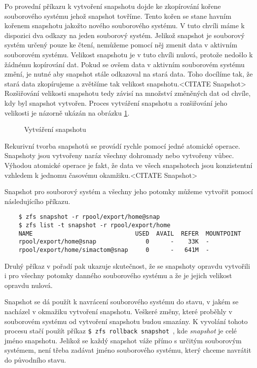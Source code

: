     Po provední příkazu k vytvoření snapshotu dojde ke zkopírování kořene souborového systému jehož snapshot tovříme. Tento kořen se stane havním kořenem snapshotu jakožto nového souborového systému. V tuto chvíli máme k dispozici dva odkazy na jeden souborový systém. Jelikož snapshot je souborový systém určený pouze ke čtení, nemůžeme pomocí něj zmenit data v aktivním souborovém systému. Velikost snapshotu je v tuto chvíli nulová, protože nedošlo k žádnému kopírování dat. Pokud se ovšem data v aktivním souborovém systému změní, je nutné aby snapshot stále odkazoval na stará data. Toho docílíme tak, že stará data zkopírujeme a zvětšíme tak velikost snapshotu.<CITATE Snapshot> Rozšiřování velikosti snapshotu tedy závisí na množství změněných dat od chvíle, kdy byl snapshot vytvořen. Proces vytváření snapshotu a rozšiřování jeho velikosti je názorně ukázán na obrázku \ref{snapshotproces}.
    \begin{figure}[h]
        \caption{Vytváření snapshotu}
        \label{snapshotproces}
    \end{figure}
    
    Rekurivní tvorba snapshotů se provádí rychle pomocí jedné atomické operace. Snapshoty jsou vytvořeny naráz všechny dohromady nebo vytvořeny vůbec. Výhodou atomické operace je fakt, že data ve všech snapshotech jsou konzistentní vzhledem k jednomu časovému okamžiku.<CITATE Snapshot>
    
    Snapshot pro souborový systém a všechny jeho potomky můžeme vytvořit pomocí následujícího příkazu.
    \begin{verbatim}
    $ zfs snapshot -r rpool/export/home@snap
    $ zfs list -t snapshot -r rpool/export/home
    NAME                             USED  AVAIL  REFER  MOUNTPOINT
    rpool/export/home@snap              0      -    33K  -
    rpool/export/home/simactom@snap     0      -   641M  -
    \end{verbatim}
    Druhý příkaz v pořadí pak ukazuje skutečnost, že se snapshoty opravdu vytvořili i pro všechny potomky danného souborového systému a že je jejich velikost opravdu nulová.
    
    Snapshot se dá použít k navrácení souborového systému do stavu, v jakém se nacházel v okmažiku vytvoření snapshotu. Veškeré změny, které proběhly v souborovém systému od vytvoření snapshotu budou smazány. K vyvolání tohoto procesu stačí použít příkaz \verb|$ zfs rollback snapshot |, kde \emph{snapshot} je celé jméno snapshotu. Jelikož se každý snapshot váže přímo s určitým souborovým systémem, není třeba zadávat jméno souborového systému, který chceme navrátit do původního stavu.
    
